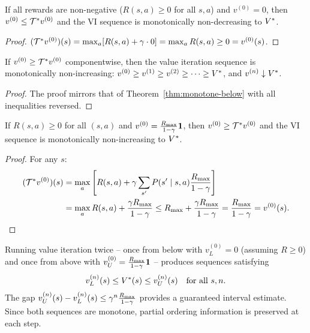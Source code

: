 \documentclass[11pt,a4paper]{article}
\begin{document}
\begin{corollary}[Standard Initialization $v^{(0)} = 0$]
\label{cor:zero-init}
If all rewards are non-negative ($R(s,a) \geq 0$ for all $s,a$) and
$v^{(0)} = 0$, then $v^{(0)} \leq \mathcal{T}^* v^{(0)}$ and the VI
sequence is monotonically non-decreasing to $\Vstar$.
\end{corollary}

\begin{proof}
$(\mathcal{T}^* v^{(0)})(s) = \max_a [R(s,a) + \gamma \cdot 0]
= \max_a R(s,a) \geq 0 = v^{(0)}(s)$.
\end{proof}

\begin{theorem}
\label{thm:monotone-above}
If $v^{(0)} \geq \mathcal{T}^* v^{(0)}$ componentwise, then the value
iteration sequence is monotonically non-increasing:
$v^{(0)} \geq v^{(1)} \geq v^{(2)} \geq \cdots \geq V^*$,
and $v^{(n)} \downarrow V^*$.
\end{theorem}

\begin{proof}
The proof mirrors that of Theorem~\ref{thm:monotone-below} with
all inequalities reversed.
\end{proof}

\begin{corollary}
\label{cor:upper-init}
If $R(s,a) \geq 0$ for all $(s,a)$ and
$v^{(0)} = \frac{R_{\max}}{1-\gamma} \mathbf{1}$, then
$v^{(0)} \geq \mathcal{T}^* v^{(0)}$ and the VI sequence is
monotonically non-increasing to $\Vstar$.
\end{corollary}

\begin{proof}
For any $s$:
\begin{align*}
    (\mathcal{T}^* v^{(0)})(s)
    &= \max_a \left[R(s,a) + \gamma \sum_{s'} P(s' \mid s,a)
    \frac{R_{\max}}{1-\gamma}\right] \\
    &= \max_a R(s,a) + \frac{\gamma R_{\max}}{1-\gamma}
    \leq R_{\max} + \frac{\gamma R_{\max}}{1-\gamma}
    = \frac{R_{\max}}{1-\gamma}
    = v^{(0)}(s). \qedhere
\end{align*}
\end{proof}

\begin{keyresult}[title={Bracketing $\Vstar$ with Monotone Sequences}]
\label{kr:bracketing}
Running value iteration twice -- once from below with
$v^{(0)}_L = 0$ (assuming $R \geq 0$) and once from above with
$v^{(0)}_U = \frac{R_{\max}}{1-\gamma} \mathbf{1}$ -- produces
sequences satisfying
\[
    v^{(n)}_L(s) \leq V^*(s) \leq v^{(n)}_U(s)
    \quad \text{for all } s, n.
\]
The gap $v^{(n)}_U(s) - v^{(n)}_L(s) \leq
\gamma^n \frac{R_{\max}}{1-\gamma}$ provides a guaranteed
interval estimate. Since both sequences are monotone, partial
ordering information is preserved at each step.
\end{keyresult}
\end{document}
